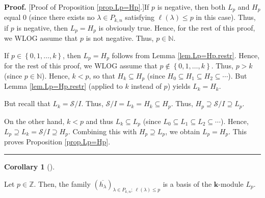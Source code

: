 \documentclass[numbers=enddot,12pt,final,onecolumn,notitlepage]{scrartcl}%
\theoremstyle{definition}
\newtheorem{coro}[theo]{Corollary}
\newenvironment{corollary}[1][]
{\begin{coro}[#1]\begin{leftbar}}
{\end{leftbar}\end{coro}}
\newenvironment{proof}[1][Proof]{\noindent\textbf{#1.} }{\ \rule{0.5em}{0.5em}}
\begin{document}
\begin{proof}
[Proof of Proposition \ref{prop.Lp=Hp}.]If $p$ is negative, then both $L_{p}$
and $H_{p}$ equal $0$ (since there exists no $\lambda\in P_{k,n}$ satisfying
$\ell\left(  \lambda\right)  \leq p$ in this case). Thus, if $p$ is negative,
then $L_{p}=H_{p}$ is obviously true. Hence, for the rest of this proof, we
WLOG assume that $p$ is not negative. Thus, $p\in\mathbb{N}$.

If $p\in\left\{  0,1,\ldots,k\right\}  $, then $L_{p}=H_{p}$ follows from
Lemma \ref{lem.Lp=Hp.restr}. Hence, for the rest of this proof, we WLOG assume
that $p\notin\left\{  0,1,\ldots,k\right\}  $. Thus, $p>k$ (since
$p\in\mathbb{N}$). Hence, $k<p$, so that $H_{k}\subseteq H_{p}$ (since
$H_{0}\subseteq H_{1}\subseteq H_{2}\subseteq\cdots$). But Lemma
\ref{lem.Lp=Hp.restr} (applied to $k$ instead of $p$) yields $L_{k}=H_{k}$.

But recall that $L_{k}=\mathcal{S}/I$. Thus, $\mathcal{S}/I=L_{k}%
=H_{k}\subseteq H_{p}$. Thus, $H_{p}\supseteq\mathcal{S}/I\supseteq L_{p}$.

On the other hand, $k<p$ and thus $L_{k}\subseteq L_{p}$ (since $L_{0}%
\subseteq L_{1}\subseteq L_{2}\subseteq\cdots$). Hence, $L_{p}\supseteq
L_{k}=\mathcal{S}/I\supseteq H_{p}$. Combining this with $H_{p}\supseteq
L_{p}$, we obtain $L_{p}=H_{p}$. This proves Proposition \ref{prop.Lp=Hp}.
\end{proof}

\begin{corollary}
\label{cor.Hp-basis}Let $p\in\mathbb{Z}$. Then, the family $\left(
\overline{h_{\lambda}}\right)  _{\lambda\in P_{k,n};\ \ell\left(
\lambda\right)  \leq p}$ is a basis of the $\mathbf{k}$-module $L_{p}$.
\end{corollary}
\end{document}
